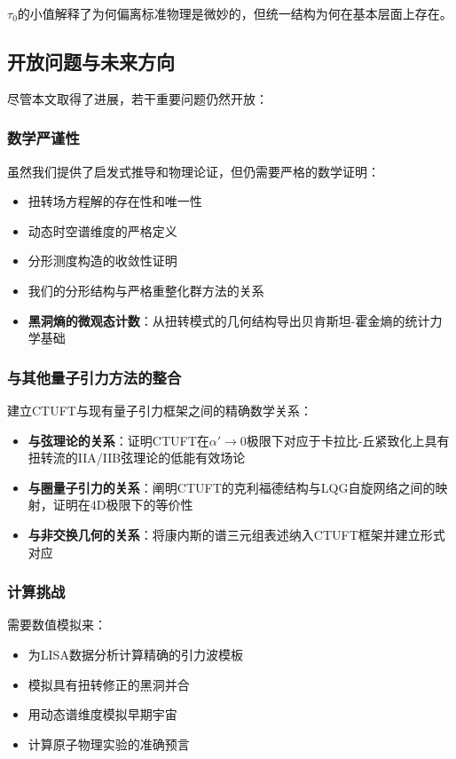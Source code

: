 $\tau_0$的小值解释了为何偏离标准物理是微妙的，但统一结构为何在基本层面上存在。

\subsection{开放问题与未来方向}

尽管本文取得了进展，若干重要问题仍然开放：

\subsubsection{数学严谨性}

虽然我们提供了启发式推导和物理论证，但仍需要严格的数学证明：
\begin{itemize}
    \item 扭转场方程解的存在性和唯一性
    \item 动态时空谱维度的严格定义
    \item 分形测度构造的收敛性证明
    \item 我们的分形结构与严格重整化群方法的关系
    \item \textbf{黑洞熵的微观态计数}：从扭转模式的几何结构导出贝肯斯坦-霍金熵的统计力学基础
\end{itemize}

\subsubsection{与其他量子引力方法的整合}

建立CTUFT与现有量子引力框架之间的精确数学关系：
\begin{itemize}
    \item \textbf{与弦理论的关系}：证明CTUFT在$\alpha' \to 0$极限下对应于卡拉比-丘紧致化上具有扭转流的IIA/IIB弦理论的低能有效场论
    \item \textbf{与圈量子引力的关系}：阐明CTUFT的克利福德结构与LQG自旋网络之间的映射，证明在4D极限下的等价性
    \item \textbf{与非交换几何的关系}：将康内斯的谱三元组表述纳入CTUFT框架并建立形式对应
\end{itemize}

\subsubsection{计算挑战}

需要数值模拟来：
\begin{itemize}
    \item 为LISA数据分析计算精确的引力波模板
    \item 模拟具有扭转修正的黑洞并合
    \item 用动态谱维度模拟早期宇宙
    \item 计算原子物理实验的准确预言
\end{itemize}

